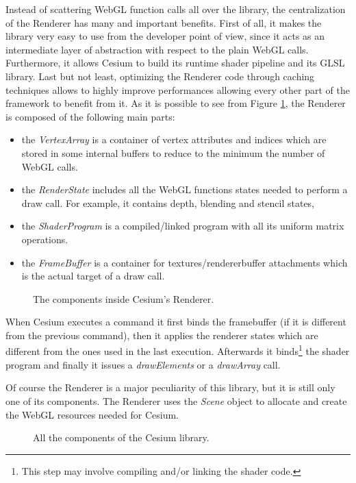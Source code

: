 Instead of scattering WebGL function calls all over the library, the centralization
of the Renderer has many and important benefits. First of all, it makes the
library very easy to use from the developer point of view, since it acts as an
intermediate layer of abstraction with respect to the plain WebGL calls. Furthermore,
it allows Cesium to build its runtime shader pipeline and its GLSL library. Last
but not least, optimizing the Renderer code through caching techniques allows
to highly improve performances allowing every other part of the framework to
benefit from it. As it is possible to see from Figure \ref{img:cesium_renderer},
the Renderer is composed of the following main parts:
\begin{itemize}
    \item the \emph{VertexArray} is a container of vertex attributes and indices
        which are stored in some internal buffers to reduce to the minimum the
        number of WebGL calls.
    \item the \emph{RenderState} includes all the WebGL functions states needed to
        perform a draw call. For example, it contains depth, blending and stencil
        states,
    \item the \emph{ShaderProgram} is a compiled/linked program with all its
        uniform matrix operations.
    \item the \emph{FrameBuffer} is a container for textures/rendererbuffer
        attachments which is the actual target of a draw call.
\end{itemize}

\begin{figure}[!htb]
    \caption{The components inside Cesium's Renderer.}
    \label{img:cesium_renderer}
\end{figure}

When Cesium executes a command it first binds the framebuffer (if it is different
from the previous command), then it applies the renderer states which are different
from the ones used in the last execution. Afterwards it binds\footnote{This step may
involve compiling and/or linking the shader code.} the shader program and finally it
issues a \emph{drawElements} or a \emph{drawArray} call.

Of course the Renderer is a major peculiarity of this library, but it is still only
one of its components. The Renderer uses the \emph{Scene} object to allocate and
create the WebGL resources needed for Cesium.
\begin{figure}[!htb]
    \caption{All the components of the Cesium library.}
    \label{img:cesium_stack}
\end{figure}


